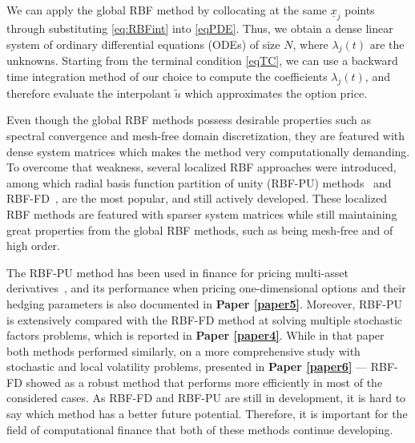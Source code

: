 \documentclass{UUThesisTemplate}
\begin{document}
\par
We can apply the global RBF method by collocating at the same $\underline{x}_j$ points through substituting \eqref{eq:RBFint} into \eqref{eqPDE}. Thus, we obtain a dense linear system of ordinary differential equations (ODEs) of size $N$, where $\lambda_j(t)$ are the unknowns. 
Starting from the terminal condition \eqref{eqTC}, we can use a backward time integration method of our choice to compute the coefficients $\lambda_j(t)$, and therefore evaluate the interpolant $\tilde u$ which approximates the option price.

\par
Even though the global RBF methods possess desirable properties such as spectral convergence and mesh-free domain discretization, they are featured with dense system matrices which makes the method very computationally demanding. To overcome that weakness, several localized RBF approaches were introduced, among which radial basis function partition of unity (RBF-PU) methods~\cite{wendland2002fast} and RBF-FD~\cite{tolstykh2000using, wright2006scattered}, are the most popular, and still actively developed. These localized RBF methods are featured with sparser system matrices while still maintaining great properties from the global RBF methods, such as being mesh-free and of high order.

\par
The RBF-PU method has been used in finance for pricing multi-asset derivatives~\cite{safdari2015radial, shcherbakov2016radialvanilla, shcherbakov2016radial}, and its performance when pricing one-dimensional options and their hedging parameters is also documented in \textbf{Paper \ref{paper5}}. Moreover, RBF-PU is extensively compared with the RBF-FD method at solving multiple stochastic factors problems, which is reported in \textbf{Paper \ref{paper4}}. While in that paper both methods performed similarly, on a more comprehensive study with stochastic and local volatility problems, presented in \textbf{Paper \ref{paper6}} --- RBF-FD showed as a robust method that performs more efficiently in most of the considered cases. As RBF-FD and RBF-PU are still in development, it is hard to say which method has a better future potential. Therefore, it is important for the field of computational finance that both of these methods continue developing.
%
\end{document}
